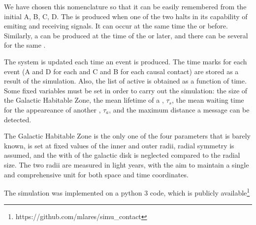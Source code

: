 We have chosen this nomenclature so that it can be easily remembered
from the initial A, B, C, D.
%
The \blackout is produced when one of the two \cetis halts in its
capability of emiting and receiving signals.
%
It can occur at the same time the \doomsday or before.
%
Similarly, a \ccontact can be produced at the time of the \aawakening
or later, and there can be several \contacts for the same \ceti.

                        

The system is updated each time an event is produced.
%
The time marks for each event (A and D for each \ceti and C and B for
each causal contact) are stored as a result of the simulation.
%
Also, the list of active \cetis is obtained as a function of time.
%
Some fixed variables must be set in order to carry out the simulation:
the size of the Galactic Habitable Zone, the mean lifetime of a \ceti,
$\tau_s$, the mean waiting time for the appeareance of another \ceti,
$\tau_a$, and the maximum distance a message can be detected.



The Galactic Habitable Zone is the only one of the four parameters
that is barely known, is set at fixed values of the inner and outer
radii, radial symmetry is assumed, and the with of the galactic disk is
neglected compared to the radial size.
%
The two radii are measured in light years, with the aim to maintain a
single and comprehensive unit for both space and time coordinates. 

The simulation was implemented on a python 3 code, which is publicly
available\footnote{https://github.com/mlares/simu\_contact}

